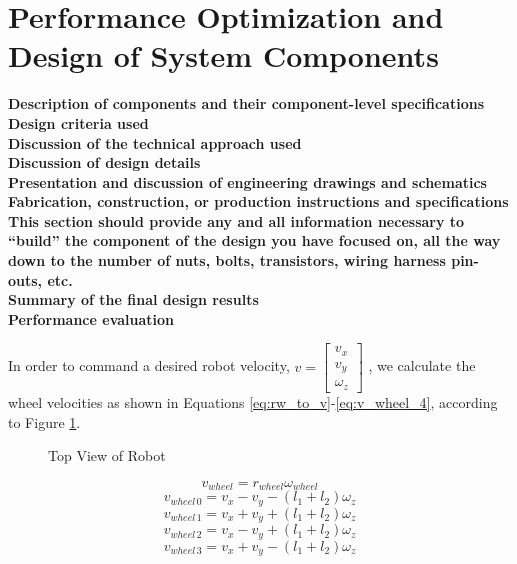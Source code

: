 \documentclass[letterpaper,12pt]{article}
\newcommand{\xxx}[1]{{\color{red}\bf #1}}
\begin{document}
\section{Performance Optimization and Design of System Components}
\label{sec:optimization}
\xxx{Description of components and their component-level specifications} \\
\xxx{Design criteria used} \\
\xxx{Discussion of the technical approach used} \\
\xxx{Discussion of design details} \\
\xxx{Presentation and discussion of engineering drawings and schematics} \\
\xxx{Fabrication, construction, or production instructions and specifications} \\
\xxx{This section should provide any and all information necessary to ``build'' the component of the design you have focused on, all the way down to the number of nuts, bolts, transistors, wiring harness pin-outs, etc.} \\
\xxx{Summary of the final design results} \\
\xxx{Performance evaluation}

In order to command a desired robot velocity,
\begin{math}
  v=
  \begin{bmatrix}
    v_x \\
    v_y \\
    \omega_z
  \end{bmatrix}
\end{math}
, we calculate the wheel velocities as shown in Equations \ref{eq:rw_to_v}-\ref{eq:v_wheel_4}, according to Figure \ref{fig:robot_top_view}.

\begin{figure}[h!]
  \centering
  
  \caption{Top View of Robot}
  \label{fig:robot_top_view}
\end{figure}

\begin{equation}
  v_{wheel}=r_{wheel}\omega_{wheel}
  \label{eq:rw_to_v}
\end{equation}
\begin{equation}
  v_{wheel\,0}=v_x-v_y-(l_1+l_2)\omega_z
  \label{eq:v_wheel_1}
\end{equation}
\begin{equation}
  v_{wheel\,1}=v_x+v_y+(l_1+l_2)\omega_z
  \label{eq:v_wheel_2}
\end{equation}
\begin{equation}
  v_{wheel\,2}=v_x-v_y+(l_1+l_2)\omega_z
  \label{eq:v_wheel_3}
\end{equation}
\begin{equation}
  v_{wheel\,3}=v_x+v_y-(l_1+l_2)\omega_z
  \label{eq:v_wheel_4}
\end{equation}
\end{document}
